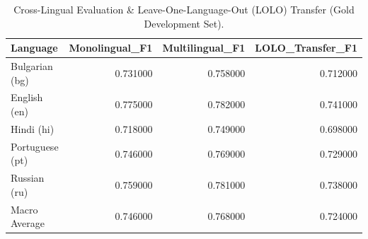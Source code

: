 \begin{table}
\caption{Cross-Lingual Evaluation & Leave-One-Language-Out (LOLO) Transfer (Gold Development Set).}
\label{tab:cross_lingual}
\begin{tabular}{lrrr}
\toprule
Language & Monolingual_F1 & Multilingual_F1 & LOLO_Transfer_F1 \\
\midrule
Bulgarian (bg) & 0.731000 & 0.758000 & 0.712000 \\
English (en) & 0.775000 & 0.782000 & 0.741000 \\
Hindi (hi) & 0.718000 & 0.749000 & 0.698000 \\
Portuguese (pt) & 0.746000 & 0.769000 & 0.729000 \\
Russian (ru) & 0.759000 & 0.781000 & 0.738000 \\
Macro Average & 0.746000 & 0.768000 & 0.724000 \\
\bottomrule
\end{tabular}
\end{table}
